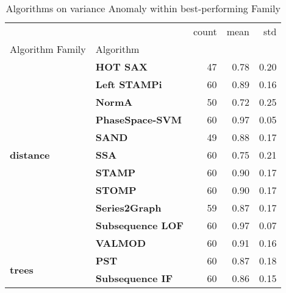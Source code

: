\begin{table}
\caption{Algorithms on variance Anomaly within best-performing Family}
\label{tab:bp-variance}
\begin{tabular}{llrrr}
\toprule
 &  & count & mean & std \\
Algorithm Family & Algorithm &  &  &  \\
\midrule
\multirow[t]{11}{*}{\textbf{distance}} & \textbf{HOT SAX} & 47 & 0.78 & 0.20 \\
\textbf{} & \textbf{Left STAMPi} & 60 & 0.89 & 0.16 \\
\textbf{} & \textbf{NormA} & 50 & 0.72 & 0.25 \\
\textbf{} & \textbf{PhaseSpace-SVM} & 60 & 0.97 & 0.05 \\
\textbf{} & \textbf{SAND} & 49 & 0.88 & 0.17 \\
\textbf{} & \textbf{SSA} & 60 & 0.75 & 0.21 \\
\textbf{} & \textbf{STAMP} & 60 & 0.90 & 0.17 \\
\textbf{} & \textbf{STOMP} & 60 & 0.90 & 0.17 \\
\textbf{} & \textbf{Series2Graph} & 59 & 0.87 & 0.17 \\
\textbf{} & \textbf{Subsequence LOF} & 60 & 0.97 & 0.07 \\
\textbf{} & \textbf{VALMOD} & 60 & 0.91 & 0.16 \\
\cline{1-5}
\multirow[t]{2}{*}{\textbf{trees}} & \textbf{PST} & 60 & 0.87 & 0.18 \\
\textbf{} & \textbf{Subsequence IF} & 60 & 0.86 & 0.15 \\
\cline{1-5}
\bottomrule
\end{tabular}
\end{table}
